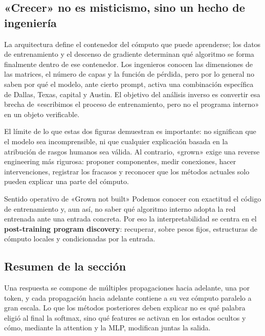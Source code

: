\subsection{«Crecer» no es misticismo, sino un hecho de ingeniería}

La arquitectura define el contenedor del cómputo que puede aprenderse; los datos de entrenamiento y el descenso de gradiente determinan qué algoritmo se forma finalmente dentro de ese contenedor. Los ingenieros conocen las dimensiones de las matrices, el número de capas y la función de pérdida, pero por lo general no saben por qué el modelo, ante cierto prompt, activa una combinación específica de Dallas, Texas, capital y Austin. El objetivo del análisis inverso es convertir esa brecha de «escribimos el proceso de entrenamiento, pero no el programa interno» en un objeto verificable.



El límite de lo que estas dos figuras demuestran es importante: no significan que el modelo sea incomprensible, ni que cualquier explicación basada en la atribución de rasgos humanos sea válida. Al contrario, «grown» exige una reverse engineering más rigurosa: proponer componentes, medir conexiones, hacer intervenciones, registrar los fracasos y reconocer que los métodos actuales solo pueden explicar una parte del cómputo.

\begin{importantbox}{Sentido operativo de «Grown not built»}
Podemos conocer con exactitud el código de entrenamiento y, aun así, no saber qué algoritmo interno adopta la red entrenada ante una entrada concreta. Por eso la interpretabilidad se centra en el \textbf{post-training program discovery}: recuperar, sobre pesos fijos, estructuras de cómputo locales y condicionadas por la entrada.
\end{importantbox}


\subsection{Resumen de la sección}

Una respuesta se compone de múltiples propagaciones hacia adelante, una por token, y cada propagación hacia adelante contiene a su vez cómputo paralelo a gran escala. Lo que los métodos posteriores deben explicar no es qué palabra eligió al final la softmax, sino qué features se activan en los estados ocultos y cómo, mediante la attention y la MLP, modifican juntas la salida.
